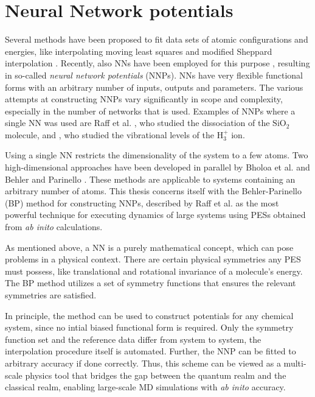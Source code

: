\documentclass[twoside,english]{uiofysmaster}
\begin{document}
\section{Neural Network potentials}
Several methods have been proposed to fit data sets of atomic configurations and energies, 
like interpolating moving least squares \cite{Dawes08} 
and modified Sheppard interpolation \cite{Ischtwan94}. Recently, also NNs have been employed for this purpose
\cite{Behler11general}, resulting in so-called \textit{neural network potentials} (NNPs). NNs have very flexible 
functional forms with an arbitrary number of inputs, outputs and parameters.
The various attempts at constructing NNPs vary significantly in scope and complexity, especially in the number of networks that is used.
Examples of NNPs where a single NN was used are Raff et al. \cite{Agrawal06}, who studied the dissociation of 
the $\mathrm{SiO}_2$ molecule, and \cite{Prudente98}, who studied the vibrational levels of the $\mathrm{H}_3^+$ ion. 

Using a single NN restricts the dimensionality of the system to a few atoms. Two high-dimensional approaches have 
been developed in parallel by Bholoa et al. \cite{Bholoa07} and Behler and Parinello \cite{Behler11symmetry}. These 
methods are applicable to systems containing an arbitrary number of atoms. 
This thesis concerns itself with the Behler-Parinello (BP) method for constructing NNPs, described by Raff et al. \cite{Raff12}
as the most powerful technique for executing dynamics of large systems using PESs obtained from \textit{ab inito} 
calculations. 

As mentioned above, a NN is a purely mathematical concept, which can pose problems in a physical context. 
There are certain physical symmetries any PES must possess, like translational and rotational invariance
of a molecule's energy. The BP method utilizes a set of symmetry functions that ensures the relevant symmetries are satisfied. 

In principle, the method can be used to construct potentials for any chemical system, since no intial biased functional form 
is required. Only the symmetry function set and the reference data differ from system to system, the interpolation procedure itself 
is automated. Further, the NNP can be fitted to arbitrary accuracy if done correctly. 
Thus, this scheme can be viewed as a multi-scale physics tool that bridges the gap between the 
quantum realm and the classical realm, enabling large-scale MD simulations with \textit{ab inito} accuracy.
\end{document}
